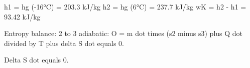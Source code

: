 h1 = hg (-16°C) = 203.3 kJ/kg  
h2 = hg (6°C) = 237.7 kJ/kg  
wK = h2 - h1 = 93.42 kJ/kg

Entropy balance:  
2 to 3 adiabatic:  
O = m dot times (s2 minus s3) plus Q dot divided by T plus delta S dot equals 0.  

Delta S dot equals 0.